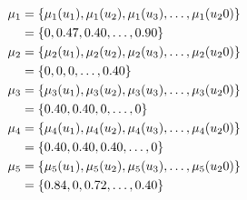 \documentclass[a4paper,openany]{book}
\begin{document}
				\begin{align}
					\mu_1 &= \{ \mu_1(u_1), \mu_1(u_2), \mu_1(u_3),\dots,\mu_1(u_20) \} \\
					&= \{ 0, 0.47, 0.40,\dots,0.90 \} \notag \\
					\mu_2 &= \{ \mu_2(u_1), \mu_2(u_2), \mu_2(u_3),\dots,\mu_2(u_20) \}\\
					&= \{ 0, 0, 0,\dots,0.40 \} \notag \\
					\mu_3 &= \{ \mu_3(u_1), \mu_3(u_2), \mu_3(u_3),\dots,\mu_3(u_20) \}\\
					&= \{ 0.40, 0.40, 0,\dots,0 \} \notag \\
					\mu_4 &= \{ \mu_4(u_1), \mu_4(u_2), \mu_4(u_3),\dots,\mu_4(u_20) \}\\
					&= \{ 0.40, 0.40, 0.40,\dots,0 \} \notag \\
					\mu_5 &= \{ \mu_5(u_1), \mu_5(u_2), \mu_5(u_3),\dots,\mu_5(u_20) \}\\
					&= \{ 0.84, 0, 0.72,\dots,0.40 \} \notag					
				\end{align}
				
\end{document}
